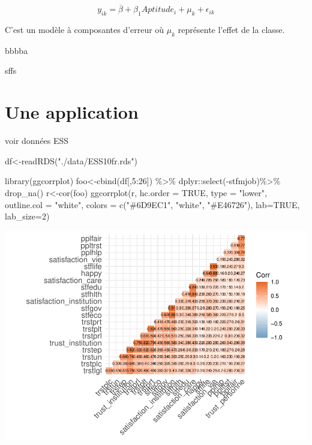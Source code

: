 \documentclass[
]{book}
\newenvironment{Shaded}{\begin{snugshade}}{\end{snugshade}}
\newcommand{\AttributeTok}[1]{\textcolor[rgb]{0.77,0.63,0.00}{#1}}
\newcommand{\ConstantTok}[1]{\textcolor[rgb]{0.00,0.00,0.00}{#1}}
\newcommand{\DecValTok}[1]{\textcolor[rgb]{0.00,0.00,0.81}{#1}}
\newcommand{\FunctionTok}[1]{\textcolor[rgb]{0.00,0.00,0.00}{#1}}
\newcommand{\NormalTok}[1]{#1}
\newcommand{\OtherTok}[1]{\textcolor[rgb]{0.56,0.35,0.01}{#1}}
\newcommand{\SpecialCharTok}[1]{\textcolor[rgb]{0.00,0.00,0.00}{#1}}
\newcommand{\StringTok}[1]{\textcolor[rgb]{0.31,0.60,0.02}{#1}}
\begin{document}
\[y_{ik}=\overline{\beta}+\beta_{1}Aptitude_{i}+\mu_{k}+\epsilon_{ik}\]

C'est un modèle à composantes d'erreur où \(\mu_{k}\) représente l'effet de la classe.

bbbba

sffs

\hypertarget{une-application}{%
\section{Une application}\label{une-application}}

voir données ESS

\begin{Shaded}
\begin{Highlighting}[]
\NormalTok{df}\OtherTok{\textless{}{-}}\FunctionTok{readRDS}\NormalTok{(}\StringTok{"./data/ESS10fr.rds"}\NormalTok{)}
\end{Highlighting}
\end{Shaded}

\begin{Shaded}
\begin{Highlighting}[]
\FunctionTok{library}\NormalTok{(ggcorrplot)}
\NormalTok{foo}\OtherTok{\textless{}{-}}\FunctionTok{cbind}\NormalTok{(df[,}\DecValTok{5}\SpecialCharTok{:}\DecValTok{26}\NormalTok{]) }\SpecialCharTok{\%\textgreater{}\%}
\NormalTok{  dplyr}\SpecialCharTok{::}\FunctionTok{select}\NormalTok{(}\SpecialCharTok{{-}}\NormalTok{stfmjob)}\SpecialCharTok{\%\textgreater{}\%}
  \FunctionTok{drop\_na}\NormalTok{()}
\NormalTok{r}\OtherTok{\textless{}{-}}\FunctionTok{cor}\NormalTok{(foo)}
\FunctionTok{ggcorrplot}\NormalTok{(r, }\AttributeTok{hc.order =} \ConstantTok{TRUE}\NormalTok{, }\AttributeTok{type =} \StringTok{"lower"}\NormalTok{,}
   \AttributeTok{outline.col =} \StringTok{"white"}\NormalTok{,}
   \AttributeTok{colors =} \FunctionTok{c}\NormalTok{(}\StringTok{"\#6D9EC1"}\NormalTok{, }\StringTok{"white"}\NormalTok{, }\StringTok{"\#E46726"}\NormalTok{), }\AttributeTok{lab=}\ConstantTok{TRUE}\NormalTok{, }\AttributeTok{lab\_size=}\DecValTok{2}\NormalTok{)}
\end{Highlighting}
\end{Shaded}

\includegraphics{bookdown-demo_files/figure-latex/1103-1.pdf}
\end{document}
